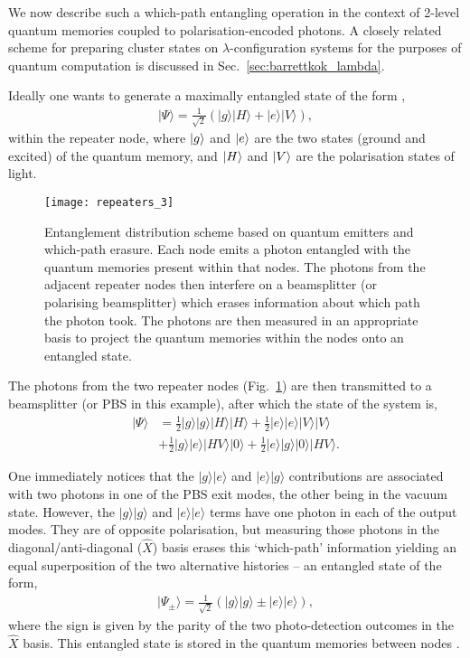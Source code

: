 We now describe such a which-path entangling operation in the context of 2-level quantum memories coupled to polarisation-encoded photons. A closely related scheme for preparing cluster states on $\lambda$-configuration systems for the purposes of quantum computation is discussed in Sec.~\ref{sec:barrettkok_lambda}.

Ideally one wants to generate a maximally entangled state of the form \cite{bib:WJM2015},
\begin{align}
|\Psi\rangle=\frac{1}{\sqrt{2}} (|g\rangle |H\rangle + |e\rangle |V\rangle),
\end{align}
within the repeater node, where $|g\rangle$ and $|e\rangle$ are the two states (ground and excited) of the quantum memory, and $|H\rangle$ and $|V\rangle$ are the polarisation states of light. 
\begin{figure}[!htb]
\texttt{[image: repeaters\_3]}
\caption{Entanglement distribution scheme based on quantum emitters and which-path erasure. Each node emits a photon entangled with the quantum memories present within that nodes. The photons from the adjacent repeater nodes then interfere on a beamsplitter (or polarising beamsplitter) which erases information about which path the photon took. The photons are then measured in an appropriate basis to project the quantum memories within the nodes onto an entangled state.} 
\label{fig:repeaters_3}
\end{figure} 
The photons from the two repeater nodes (Fig.~\ref{fig:repeaters_3}) are then transmitted to a beamsplitter (or PBS in this example), after which the state of the system is,
\begin{align}
|\Psi\rangle &= \frac{1}{2} |g\rangle |g\rangle |H\rangle |H\rangle +\frac{1}{2} |e\rangle |e\rangle |V\rangle |V\rangle \nonumber \\
&+\frac{1}{2} |g\rangle |e\rangle |HV\rangle |0\rangle + \frac{1}{2} |e\rangle |g\rangle |0\rangle |HV\rangle. 
\end{align}

One immediately notices that the $|g\rangle |e\rangle$ and $|e\rangle |g\rangle$ contributions are associated with two photons in one of the PBS exit modes, the other being in the vacuum state. However, the $|g\rangle |g\rangle$ and $|e\rangle |e\rangle$ terms have one photon in each of the output modes. They are of opposite polarisation, but measuring those photons in the diagonal/anti-diagonal ($\hat{X}$) basis erases this `which-path' information yielding an equal superposition of the two alternative histories -- an entangled state of the form,
\begin{align}
|\Psi_\pm\rangle=\frac{1}{\sqrt{2}} (|g\rangle |g\rangle \pm |e\rangle |e\rangle),
\end{align}
where the sign is given by the parity of the two photo-detection outcomes in the $\hat{X}$ basis. This entangled state is stored in the quantum memories between nodes \cite{}. 

